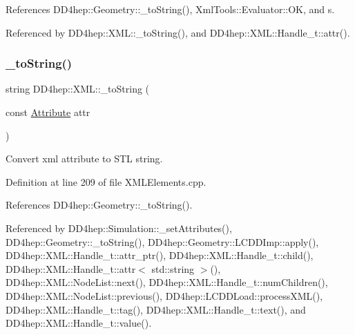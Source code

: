 References D\+D4hep\+::\+Geometry\+::\+\_\+to\+String(), Xml\+Tools\+::\+Evaluator\+::\+OK, and s.



Referenced by D\+D4hep\+::\+X\+M\+L\+::\+\_\+to\+String(), and D\+D4hep\+::\+X\+M\+L\+::\+Handle\+\_\+t\+::attr().

\hypertarget{group___d_d4_h_e_p___x_m_l_gad2124529d3b80b7896b4d5a370ee906e}{}\label{group___d_d4_h_e_p___x_m_l_gad2124529d3b80b7896b4d5a370ee906e} 
\subsubsection{\texorpdfstring{\+\_\+to\+String()}{\_toString()}\hspace{0.1cm}{\footnotesize\ttfamily [1/12]}}
{\footnotesize\ttfamily string D\+D4hep\+::\+X\+M\+L\+::\+\_\+to\+String (\begin{DoxyParamCaption}\item[{const \hyperlink{namespace_d_d4hep_1_1_x_m_l_a5c19b7116be99d69b4b22d911357baaf}{Attribute}}]{attr }\end{DoxyParamCaption})}



Convert xml attribute to S\+TL string. 



Definition at line 209 of file X\+M\+L\+Elements.\+cpp.



References D\+D4hep\+::\+Geometry\+::\+\_\+to\+String().



Referenced by D\+D4hep\+::\+Simulation\+::\+\_\+set\+Attributes(), D\+D4hep\+::\+Geometry\+::\+\_\+to\+String(), D\+D4hep\+::\+Geometry\+::\+L\+C\+D\+D\+Imp\+::apply(), D\+D4hep\+::\+X\+M\+L\+::\+Handle\+\_\+t\+::attr\+\_\+ptr(), D\+D4hep\+::\+X\+M\+L\+::\+Handle\+\_\+t\+::child(), D\+D4hep\+::\+X\+M\+L\+::\+Handle\+\_\+t\+::attr$<$ std\+::string $>$(), D\+D4hep\+::\+X\+M\+L\+::\+Node\+List\+::next(), D\+D4hep\+::\+X\+M\+L\+::\+Handle\+\_\+t\+::num\+Children(), D\+D4hep\+::\+X\+M\+L\+::\+Node\+List\+::previous(), D\+D4hep\+::\+L\+C\+D\+D\+Load\+::process\+X\+M\+L(), D\+D4hep\+::\+X\+M\+L\+::\+Handle\+\_\+t\+::tag(), D\+D4hep\+::\+X\+M\+L\+::\+Handle\+\_\+t\+::text(), and D\+D4hep\+::\+X\+M\+L\+::\+Handle\+\_\+t\+::value().

